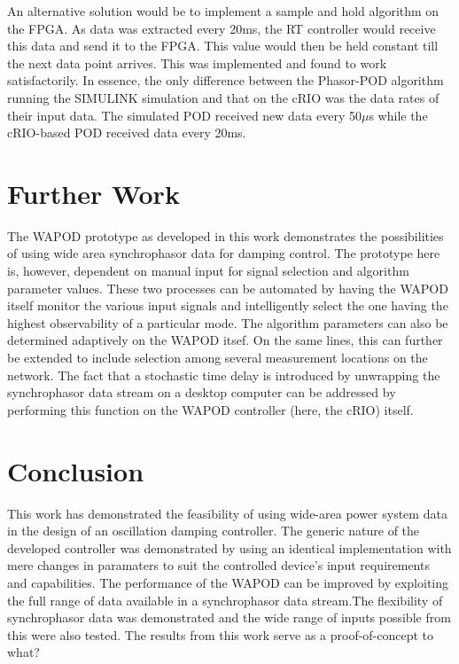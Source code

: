 \documentclass[journal]{IEEEtran}
\begin{document}
An alternative solution would be to implement a sample and hold algorithm on the FPGA. As data was extracted every 20ms, the RT controller would receive this data and send it to the FPGA. This value would then be held constant till the next data point arrives. This was implemented and found to work satisfactorily. In essence, the only difference between the Phasor-POD algorithm running the SIMULINK simulation and that on the cRIO was the data rates of their input data. The simulated POD received new data every 50$\mu$s while the cRIO-based POD received data every 20ms.


\section{Further Work}\label{Future}

The WAPOD prototype as developed in this work demonstrates the possibilities of using wide area synchrophasor data for damping control. The prototype here is, however, dependent on manual input for signal selection and algorithm parameter values. These two processes can be automated by having the WAPOD itself monitor the various input signals and intelligently select the one having the highest observability of a particular mode. The algorithm parameters can also be determined adaptively on the WAPOD itsef. On the same lines, this can further be extended to include selection among several measurement locations on the network. The fact that a stochastic time delay is introduced by unwrapping the synchrophasor data stream on a desktop computer can be addressed by performing this function on the WAPOD controller (here, the cRIO) itself.

\section{Conclusion}\label{Conclusion}
This work has demonstrated the feasibility of using wide-area power system data in the design of an oscillation damping controller. The generic nature of the developed controller was demonstrated by using an identical implementation with mere changes in paramaters to suit the controlled device's input requirements and capabilities. The performance of the WAPOD can be improved by exploiting the full range of data available in a synchrophasor data stream.The flexibility of synchrophasor data was demonstrated and the wide range of inputs possible from this were also tested. The results from this work serve as a proof-of-concept to what?
\end{document}
